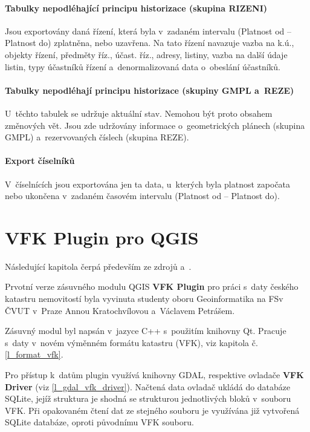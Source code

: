 \documentclass[a4paper,12pt,oneside]{book}
\begin{document}
\subsubsection{Tabulky nepodléhající principu historizace (skupina RIZENI)}

Jsou exportovány daná řízení, která byla v~zadaném intervalu (Platnost
od -- Platnost do) zplatněna, nebo uzavřena. Na tato řízení navazuje
vazba na k.ú., objekty řízení, předměty říz., účast. říz., adresy,
listiny, vazba na další údaje listin, typy účastníků řízení
a~denormalizovaná data o~obeslání účastníků.

\subsubsection{Tabulky nepodléhají principu historizace (skupiny GMPL a~REZE)}

U~těchto tabulek se udržuje aktuální stav. Nemohou být proto obsahem
změnových vět. Jsou zde udržovány informace o~geometrických plánech
(skupina GMPL) a~rezervovaných číslech (skupina
REZE).

\subsubsection{Export číselníků}

V~číselnících jsou exportována jen ta data, u~kterých byla platnost
započata nebo ukončena v~zadaném časovém intervalu (Platnost od --
Platnost do).


\clearpage
\chapter{VFK Plugin pro QGIS}
Následující kapitola čerpá především ze zdrojů \cite{cvut_vfkPlugin} a~\cite{geoinformatics_vfkPlugin}.

Prvotní verze zásuvného modulu QGIS \textbf{VFK Plugin} pro práci
s~daty českého katastru nemovitostí byla vyvinuta studenty oboru
Geoinformatika na FSv ČVUT v~Praze Annou Kratochvílovou a~Václavem
Petrášem.

Zásuvný modul byl napsán v~jazyce C++ s~použitím knihovny Qt. Pracuje
s~daty v~novém výměnném formátu katastru (VFK), viz kapitola
č. \ref{l_format_vfk}.

Pro přístup k~datům plugin využívá knihovny GDAL, respektive ovladače
\textbf{VFK Driver} (viz \ref{l_gdal_vfk_driver}). Načtená data ovladač ukládá do databáze SQLite,
jejíž struktura je shodná se strukturou jednotlivých bloků v~souboru
VFK. Při opakovaném čtení dat ze stejného souboru je využívána již
vytvořená SQLite databáze, oproti původnímu VFK souboru.
\end{document}
